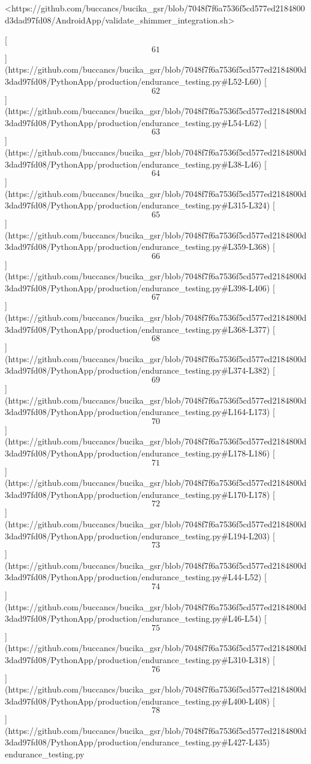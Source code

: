 \documentclass[12pt,a4paper]{article}
\begin{document}
{<https://github.com/buccancs/bucika_gsr/blob/7048f7f6a7536f5cd577ed2184800d3dad97fd08/AndroidApp/validate_shimmer_integration.sh>

[\[61\]](https://github.com/buccancs/bucika_gsr/blob/7048f7f6a7536f5cd577ed2184800d3dad97fd08/PythonApp/production/endurance_testing.py#L52-L60)
[\[62\]](https://github.com/buccancs/bucika_gsr/blob/7048f7f6a7536f5cd577ed2184800d3dad97fd08/PythonApp/production/endurance_testing.py#L54-L62)
[\[63\]](https://github.com/buccancs/bucika_gsr/blob/7048f7f6a7536f5cd577ed2184800d3dad97fd08/PythonApp/production/endurance_testing.py#L38-L46)
[\[64\]](https://github.com/buccancs/bucika_gsr/blob/7048f7f6a7536f5cd577ed2184800d3dad97fd08/PythonApp/production/endurance_testing.py#L315-L324)
[\[65\]](https://github.com/buccancs/bucika_gsr/blob/7048f7f6a7536f5cd577ed2184800d3dad97fd08/PythonApp/production/endurance_testing.py#L359-L368)
[\[66\]](https://github.com/buccancs/bucika_gsr/blob/7048f7f6a7536f5cd577ed2184800d3dad97fd08/PythonApp/production/endurance_testing.py#L398-L406)
[\[67\]](https://github.com/buccancs/bucika_gsr/blob/7048f7f6a7536f5cd577ed2184800d3dad97fd08/PythonApp/production/endurance_testing.py#L368-L377)
[\[68\]](https://github.com/buccancs/bucika_gsr/blob/7048f7f6a7536f5cd577ed2184800d3dad97fd08/PythonApp/production/endurance_testing.py#L374-L382)
[\[69\]](https://github.com/buccancs/bucika_gsr/blob/7048f7f6a7536f5cd577ed2184800d3dad97fd08/PythonApp/production/endurance_testing.py#L164-L173)
[\[70\]](https://github.com/buccancs/bucika_gsr/blob/7048f7f6a7536f5cd577ed2184800d3dad97fd08/PythonApp/production/endurance_testing.py#L178-L186)
[\[71\]](https://github.com/buccancs/bucika_gsr/blob/7048f7f6a7536f5cd577ed2184800d3dad97fd08/PythonApp/production/endurance_testing.py#L170-L178)
[\[72\]](https://github.com/buccancs/bucika_gsr/blob/7048f7f6a7536f5cd577ed2184800d3dad97fd08/PythonApp/production/endurance_testing.py#L194-L203)
[\[73\]](https://github.com/buccancs/bucika_gsr/blob/7048f7f6a7536f5cd577ed2184800d3dad97fd08/PythonApp/production/endurance_testing.py#L44-L52)
[\[74\]](https://github.com/buccancs/bucika_gsr/blob/7048f7f6a7536f5cd577ed2184800d3dad97fd08/PythonApp/production/endurance_testing.py#L46-L54)
[\[75\]](https://github.com/buccancs/bucika_gsr/blob/7048f7f6a7536f5cd577ed2184800d3dad97fd08/PythonApp/production/endurance_testing.py#L310-L318)
[\[76\]](https://github.com/buccancs/bucika_gsr/blob/7048f7f6a7536f5cd577ed2184800d3dad97fd08/PythonApp/production/endurance_testing.py#L400-L408)
[\[78\]](https://github.com/buccancs/bucika_gsr/blob/7048f7f6a7536f5cd577ed2184800d3dad97fd08/PythonApp/production/endurance_testing.py#L427-L435)
endurance_testing.py

}
\end{document}
